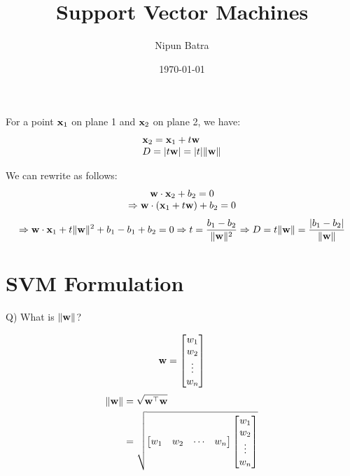 \documentclass{beamer}
\title{Support Vector Machines}
\date{\today}
\author{Nipun Batra}
\institute{IIT Gandhinagar}
\begin{document}
\maketitle

\begin{frame}For a point $\mathbf{x}_1$ on plane 1 and $\mathbf{x}_2$ on plane 2, we have:
\pause $$
\begin{array}{l}
{\mathbf{x}_{2}=\mathbf{x}_{1}+t \mathbf{w}} \\
{D=|t \mathbf{w}|=|t|\|\mathbf{w}\|}
\end{array}
$$

\pause We can rewrite as follows:
\pause $$
\begin{array}{c}
{\mathbf{w}\cdot \mathbf{x}_{2}+b_{2}=0} \\
{\Rightarrow \mathbf{w} \cdot\left(\mathbf{x}_{1}+t \mathbf{w}\right)+b_{2}=0}
\end{array}
$$
\pause $$
\Rightarrow \mathbf{w} \cdot \mathbf{x}_{1}+t\|\mathbf{w}\|^{2}+b_1-b_1+b_2 = 0
\Rightarrow t = \frac{b_1 - b_2}{\|\mathbf{w}\|^{2}}  \Rightarrow D = t\|\mathbf{w}\| =  \frac{|b_1 - b_2|}{\|\mathbf{w}\|}
$$
\end{frame}


\section{SVM Formulation}

{
	
}

\begin{frame}Q) What is $\|\mathbf{w}\|$?
\pause
\begin{multicols}{2}
\begin{equation*}
	 \mathbf{w} = \begin{bmatrix}
	 w_{1} \\
     w_{2} \\
     \vdots  \\
     w_{n} \\
	\end{bmatrix}
\end{equation*}\break
\begin{align*}
	 \|\mathbf{w}\| &= \sqrt{\mathbf{w}^\top\mathbf{w}}\\
	 &= \sqrt{\begin{bmatrix}
	 w_{1} & w_{2} & \cdots & w_{n}
	 \end{bmatrix}
	 \begin{bmatrix}
	  w_{1} \\
	  w_{2} \\
     \vdots  \\
     w_{n} \\
	 \end{bmatrix}}
\end{align*}

\end{multicols}

\end{frame}
\end{document}
